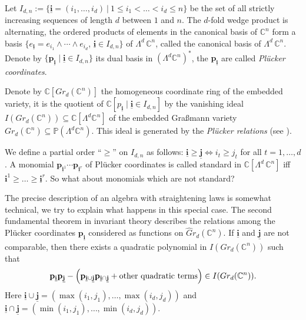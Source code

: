 \documentclass{emsprocart}
\theoremstyle{definition}
\begin{document}
Let $I_{d,n}:=\{\underline{\mathbf i}=(i_1,\dots,i_d)\ |\ 1\le i_1<\dots<i_d\le n\}$ be the set of all strictly
increasing sequences of length $d$ between $1$ and $n$. The $d$-fold wedge product is alternating, the ordered
products of elements in the canonical basis of $\mathbb C^n$ form a basis
$\{e_{\underline{\mathbf i}}=e_{i_{1}}\wedge \cdots\wedge e_{i_{d}}$,  $\underline{\mathbf i}\in I_{d,n}\}$
of $\Lambda^d\,\mathbb C^n$, called the canonical basis of $\Lambda^d\,\mathbb C^n$.
Denote by $\{\mathbf p_{\underline{\mathbf i}}\mid \underline{\mathbf i}\in I_{d,n}\}$ its dual basis in $(\Lambda^{d} \mathbb C^n)^*$,
the $\mathbf p_{\underline{\mathbf i}}$ are called {\it Pl\"ucker coordinates}.

Denote by $\mathbb C[Gr_{d}(\mathbb C^n)]$ the homogeneous coordinate ring of the embedded
variety, it is the quotient of $\mathbb C[p_{\underline{\mathbf i}}\mid \underline{\mathbf i}\in I_{d,n}]$
by the vanishing ideal $I(Gr_{d}(\mathbb C^n))\subseteq \mathbb C[\Lambda^d \mathbb C^n]$
of the embedded Gra\ss mann variety $Gr_{d}(\mathbb C^n)\subseteq {\mathbb P}(\Lambda^d \mathbb C^n)$.
This ideal is generated by the {\it Pl\"ucker relations} (see \cite{BL,S}).

We define a partial order ``$\ge$'' on $I_{d,n}$ as follows:
$\underline{\mathbf i}\ge \underline{\mathbf j} \Leftrightarrow i_t\ge j_t$ for all $t=1,\ldots,d$.
A monomial $\mathbf p_{\underline{\mathbf i}^1}\cdots \mathbf p_{\underline{\mathbf i}^r}$ of Pl\"ucker coordinates
is called standard in $\mathbb C[\Lambda^d\,\mathbb C^n]$ iff ${\mathbf i}^1\ge \ldots \ge \underline{\mathbf i}^r$.
So what about monomials which are not standard?

The precise description of an algebra with straightening laws is somewhat technical,
we try to explain what happens in this special case. The second fundamental theorem in invariant theory
describes the relations among the Pl\"ucker coordinates
$\mathbf p_{\underline{\mathbf i}}$ considered as functions on ${\widehat Gr_{d}(\mathbb C^n)}$. If $\underline{\mathbf i}$ and $\underline{\mathbf j}$
are not comparable, then there exists a quadratic polynomial in $I(Gr_{d}(\mathbb C^n))$ such that
\begin{equation}\label{pluecker}
\mathbf p_{\underline{\mathbf i}}\mathbf p_{\underline{\mathbf j}}- \left(\mathbf p_{\underline{\mathbf i}\cup \underline{\mathbf j}} \mathbf p_{\underline{\mathbf i}\cap \underline{\mathbf j}} +
\hbox{other quadratic terms} \right) \in I(Gr_{d}(\mathbb C^n)).
\end{equation}
Here $\underline{\mathbf i}\cup \underline{\mathbf j}=(\max(i_1,j_1),\ldots,\max(i_d,j_d))$
and $\underline{\mathbf i}\cap \underline{\mathbf j}=(\min(i_1,j_1),\ldots,\min(i_d,j_d))$.
\end{document}
